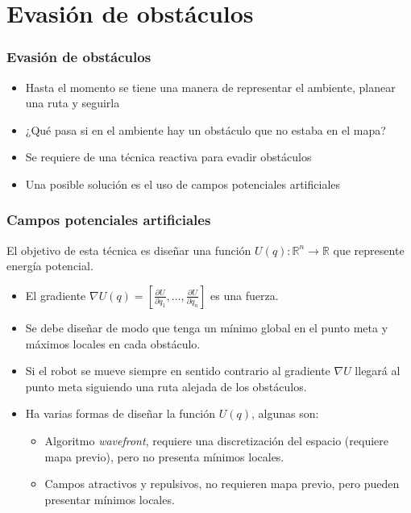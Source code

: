 \documentclass[10pt,spanish,aspectratio=1610]{beamer}
\begin{document}
\section{Evasión de obstáculos}
\begin{frame}\frametitle{Evasión de obstáculos}
  \begin{itemize}
  \item Hasta el momento se tiene una manera de representar el ambiente, planear una ruta y seguirla
  \item ¿Qué pasa si en el ambiente hay un obstáculo que no estaba en el mapa?
  \item Se requiere de una técnica reactiva para evadir obstáculos
  \item Una posible solución es el uso de campos potenciales artificiales
  \end{itemize}
\end{frame}

\begin{frame}\frametitle{Campos potenciales artificiales}
  El objetivo de esta técnica es diseñar una función $U(q):\mathbb{R}^n\rightarrow \mathbb{R}$ que represente energía potencial.
  \begin{itemize}
  \item El gradiente $\nabla U(q) = \left[\frac{\partial U}{\partial q_1},\dots,\frac{\partial U}{\partial q_n}\right]$ es una fuerza.
  \item Se debe diseñar de modo que tenga un mínimo global en el punto meta y máximos locales en cada obstáculo.
  \item Si el robot se mueve siempre en sentido contrario al gradiente $\nabla U$ llegará al punto meta siguiendo una ruta alejada de los obstáculos.
  \item Ha varias formas de diseñar la función $U(q)$, algunas son:
    \begin{itemize}
    \item Algoritmo \textit{wavefront}, requiere una discretización del espacio (requiere mapa previo), pero no presenta mínimos locales.
    \item Campos atractivos y repulsivos, no requieren mapa previo, pero pueden presentar mínimos locales. 
    \end{itemize}
  \end{itemize}
\end{frame}
\end{document}

